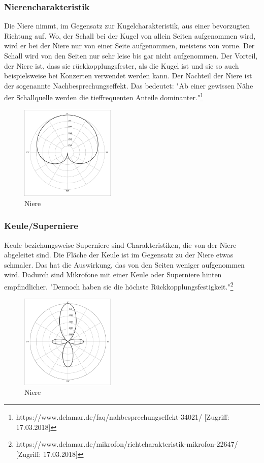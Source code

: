 \subsubsection{Nierencharakteristik}
Die Niere nimmt, im Gegensatz zur Kugelcharakteristik, aus einer bevorzugten Richtung auf. Wo, der Schall bei der Kugel von allein Seiten aufgenommen wird, wird er bei der Niere nur von einer Seite aufgenommen, meistens von vorne. Der Schall wird von den Seiten nur sehr leise bis gar nicht aufgenommen. Der Vorteil, der Niere ist, dass sie rückkopplungsfester, als die Kugel ist und sie so auch beispielsweise bei Konzerten verwendet werden kann. Der Nachteil der Niere ist der sogenannte Nachbesprechungseffekt. Das bedeutet: "Ab einer gewissen Nähe der Schallquelle werden die tieffrequenten Anteile dominanter."\footnote{\label{foot:8}https://www.delamar.de/faq/nahbesprechungseffekt-34021/ [Zugriff: 17.03.2018]}
\begin{figure}[h]
	\centering
	\includegraphics[width=0.4\textwidth]{abb5} 
	\caption{Niere}
\end{figure}
\subsubsection{Keule/Superniere}
Keule beziehungsweise Superniere sind Charakteristiken, die von der Niere abgeleitet sind. Die Fläche der Keule  ist im Gegensatz zu der Niere etwas schmaler. Das hat die Auswirkung, das von den Seiten weniger aufgenommen wird. Dadurch sind Mikrofone mit einer Keule oder Superniere hinten empfindlicher. "Dennoch haben sie die höchste Rückkopplungsfestigkeit."\footnote{\label{foot:9}https://www.delamar.de/mikrofon/richtcharakteristik-mikrofon-22647/ [Zugriff: 17.03.2018]}
\begin{figure}[h]
	\centering
	\includegraphics[width=0.4\textwidth]{abb6} 
	\caption{Niere}
\end{figure}

